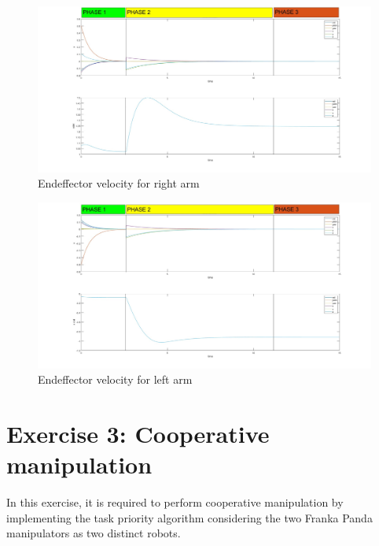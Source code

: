 \documentclass{article}
\begin{document}
\begin{figure}[h]
	\centering
	\includegraphics[width=1\textwidth]{imgs/ex2/velocity right.jpg}
	\caption{\label{fig:1} Endeffector velocity for right arm}
\end{figure}

\begin{figure}[h]
	\centering
	\includegraphics[width=1\textwidth]{imgs/ex2/velocity left .jpg}
	\caption{\label{fig:1} Endeffector velocity for left arm}
\end{figure}

\clearpage

\section{Exercise 3: Cooperative manipulation}
In this exercise, it is required to perform cooperative manipulation by implementing the task priority algorithm considering the two Franka Panda manipulators as two distinct robots. 
\end{document}

